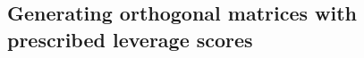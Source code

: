 \documentclass[twoside,11pt]{book}
\numberwithin{theorem}{chapter}
\numberwithin{definition}{chapter}
\numberwithin{proposition}{chapter}
\numberwithin{corollary}{chapter}
\numberwithin{example}{chapter}
\numberwithin{lemma}{chapter}
\numberwithin{assumption}{chapter}
\numberwithin{equation}{chapter}
\numberwithin{figure}{chapter}
\DeclareMathOperator{\Det}{Det}
\DeclareMathOperator{\Cor}{\mathrm{Cor}}
\DeclareMathOperator{\Tran}{\intercal}
\DeclareMathOperator{\Prb}{\mathbb{P}}
\begin{document}
\begin{subappendices}





\section{Generating orthogonal matrices with prescribed leverage scores}
\label{app:framebuilding}



\end{subappendices}
\end{document}
